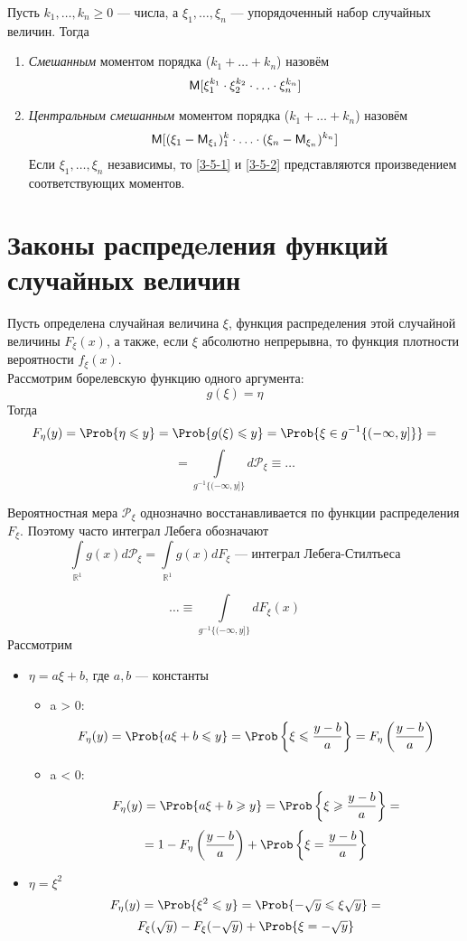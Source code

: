 \begin{definition}
  Пусть $k_1, \ldots, k_n \geqslant 0$ --- числа, а $\xi_1, \ldots, \xi_n$ --- упорядоченный набор случайных величин. Тогда
  \begin{enumerate}
    \item \label{3-5-1} \textit{Смешанным} моментом порядка ($k_1 + \ldots + k_n$) назовём
    \[
      \mathsf{M} [\xi_1^{k_1} \cdot \xi_2^{k_2} \cdot \ldots \cdot \xi_n^{k_n}]
    \]
    \item \label{3-5-2} \textit{Центральным смешанным} моментом порядка ($k_1 + \ldots + k_n$) назовём
    \[
      \mathsf{M} [(\xi_1 - \mathsf{M}_{\xi_1})^k_1 \cdot \ldots \cdot (\xi_n - \mathsf{M}_{\xi_n})^{k_n}]
    \]
    Если $\xi_1, \ldots, \xi_n$ независимы, то \ref{3-5-1} и \ref{3-5-2} представляются произведением соответствующих моментов.
  \end{enumerate}
\end{definition}

\section{Законы распредeления функций случайных величин}
Пусть определена случайная величина $\xi$, функция распределения этой случайной величины $F_{\xi}(x)$, а также, если $\xi$ абсолютно непрерывна, то функция плотности вероятности $f_{\xi}(x)$. \\
Рассмотрим борелевскую функцию одного аргумента:
\[
  g(\xi) = \eta
\]
Тогда
\[
  F_{\eta} (y) = \Prob \{ \eta \leqslant y \} = \Prob \{ g(\xi) \leqslant y \} = \Prob \{ \xi \in g^{-1} \{ (-\infty, y] \} \} =
\]
\[
  = \int\limits_{g^{-1} \{ (-\infty, y] \}} d \mathcal{P}_{\xi} \equiv \ldots
\]
\begin{addition}
  Вероятностная мера $\mathcal{P}_{\xi}$ однозначно восстанавливается по функции распределения $F_{\xi}$. Поэтому часто интеграл Лебега обозначают
  \[
    \int\limits_{\mathbb{R}^1} g(x) d \mathcal{P}_{\xi} = \int\limits_{\mathbb{R}^1} g(x) dF_{\xi} \text{ --- интеграл Лебега-Стилтьеса}
  \]
\end{addition}
\[
 \ldots \equiv \int\limits_{g^{-1} \{ (-\infty, y] \}} d F_{\xi} (x)
\]
Рассмотрим
\begin{itemize}
  \item $\eta = a \xi + b$, где $a, b$ --- константы
  \begin{itemize}
    \item a > 0:
    \[
      F_{\eta} (y) = \Prob \{a \xi + b \leqslant y \} = \Prob \left\{ \xi \leqslant \frac{y-b}{a} \right\} = F_{\eta} \left( \frac{y-b}{a} \right)
    \]
    \item a < 0:
    \[
      F_{\eta} (y) = \Prob \{a \xi + b \geqslant y \} = \Prob \left\{ \xi \geqslant \frac{y-b}{a} \right\} =
    \]
    \[
      = 1 - F_{\eta} \left( \frac{y-b}{a}\right) + \Prob \left\{ \xi = \frac{y-b}{a} \right\}
    \]
  \end{itemize}
  \item $\eta = \xi^2$
	\[
		F_{\eta}(y) =  \Prob \{\xi^2 \leqslant y \} = \Prob \{ -\sqrt{y} \leqslant \xi \sqrt{y} \} =
	\]
	\[
		F_{\xi}(\sqrt{y})  - F_{\xi} (-\sqrt{ y }) + \Prob \{ \xi = -\sqrt{y} \}
	\]
\end{itemize}

